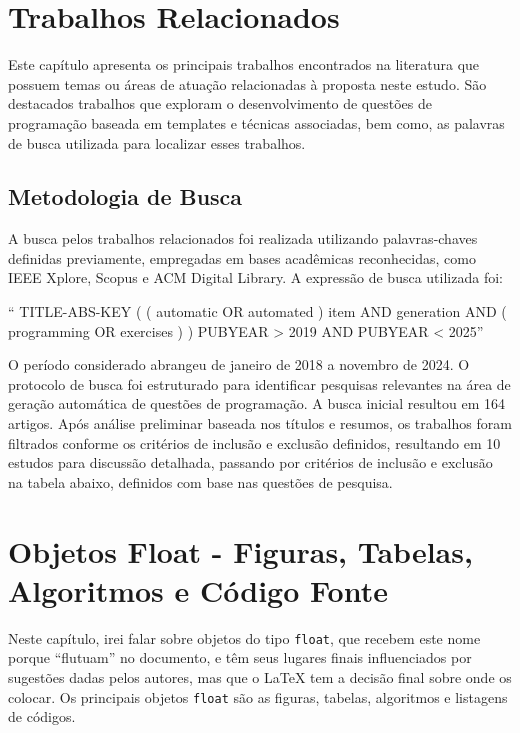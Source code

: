 \chapter{Trabalhos Relacionados}\label{cap:trabalhos-relacionados}

Este capítulo apresenta os principais trabalhos encontrados na literatura que possuem temas ou áreas de atuação relacionadas à proposta neste estudo. São destacados trabalhos que exploram o desenvolvimento de questões de programação baseada em templates e técnicas associadas, bem como, as palavras de busca utilizada para localizar esses trabalhos.

\section{Metodologia de Busca}

A busca pelos trabalhos relacionados foi realizada utilizando palavras-chaves definidas previamente, empregadas em bases acadêmicas reconhecidas, como IEEE Xplore, Scopus e ACM Digital Library. A expressão de busca utilizada foi:

“ TITLE-ABS-KEY ( ( automatic OR automated ) item AND generation AND ( programming OR exercises ) ) PUBYEAR > 2019 AND PUBYEAR < 2025”

O período considerado abrangeu de janeiro de 2018 a novembro de 2024. O protocolo de busca foi estruturado para identificar pesquisas relevantes na área de geração automática de questões de programação. A busca inicial resultou em 164 artigos. Após análise preliminar baseada nos títulos e resumos, os trabalhos foram filtrados conforme os critérios de inclusão e exclusão definidos, resultando em 10 estudos para discussão detalhada, passando por critérios de inclusão e exclusão na tabela abaixo, definidos com base nas questões de pesquisa. 

\chapter{Objetos Float - Figuras, Tabelas, Algoritmos e Código Fonte}\label{cap:float}

Neste capítulo, irei falar sobre objetos do tipo \texttt{float}, que recebem este nome porque ``flutuam'' no documento, e têm seus lugares finais influenciados por sugestões dadas pelos autores, mas que o \LaTeX{} tem a decisão final sobre onde os colocar. Os principais objetos \texttt{float} são as figuras, tabelas, algoritmos e listagens de códigos. 

